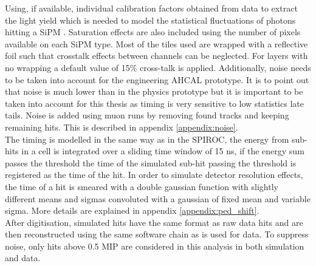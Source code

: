 Using, if available, individual calibration factors obtained from data to extract the light yield which is needed to model the statistical fluctuations of photons hitting a SiPM \cite{Hartbrich:2016bbz}. Saturation effects are also included using the number of pixels available on each SiPM type. Most of the tiles used are wrapped with a reflective foil such that crosstalk effects between channels can be neglected. For layers with no wrapping a default value of 15\% cross-talk is applied. Additionally, noise needs to be taken into account for the engineering AHCAL prototype. It is to point out that noise is much lower than in the physics prototype but it is important to be taken into account for this thesis as timing is very sensitive to low statistics late tails. Noise is added using muon runs by removing found tracks and keeping remaining hits. This is described in appendix \ref{appendix:noise}.\\

The timing is modelled in the same way as in the SPIROC, the energy from sub-hits in a cell is integrated over a sliding time window of 15 ns, if the energy sum passes the threshold the time of the simulated sub-hit passing the threshold is registered as the time of the hit. In order to simulate detector resolution effects, the time of a hit is smeared with a double gaussian function with slightly different means and sigmas convoluted with a gaussian of fixed mean and variable sigma. More details are explained in appendix \ref{appendix:ped_shift}.\\

After digitisation, simulated hits have the same format as raw data hits and are then reconstructed using the same software chain as is used for data. To suppress noise, only hits above 0.5 MIP are considered in this analysis in both simulation and data.
